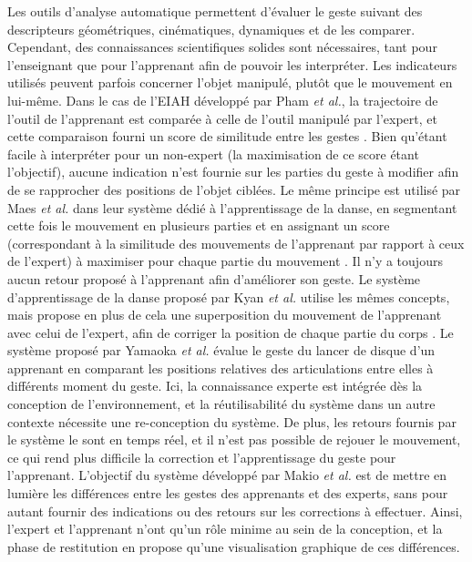 Les outils d'analyse automatique permettent d'évaluer le geste suivant des descripteurs géométriques, cinématiques, dynamiques et de les comparer. Cependant, des connaissances scientifiques solides sont nécessaires, tant pour l'enseignant que pour l'apprenant afin de pouvoir les interpréter. Les indicateurs utilisés peuvent parfois concerner l'objet manipulé, plutôt que le mouvement en lui-même. Dans le cas de l'EIAH développé par Pham \textit{et al.}, la trajectoire de l'outil de l'apprenant est comparée à celle de l'outil manipulé par l'expert, et cette comparaison fourni un score de similitude entre les gestes \parencite{Pham2010Tdg}. Bien qu'étant facile à interpréter pour un non-expert (la maximisation de ce score étant l'objectif), aucune indication n'est fournie sur les parties du geste à modifier afin de se rapprocher des positions de l'objet ciblées. Le même principe est utilisé par Maes \textit{et al.} dans leur système dédié à l'apprentissage de la danse, en segmentant cette fois le mouvement en plusieurs parties et en assignant un score (correspondant à la similitude des mouvements de l'apprenant par rapport à ceux de l'expert) à maximiser pour chaque partie du mouvement \parencite{Maes2012DtM}. Il n'y a toujours aucun retour proposé à l'apprenant afin d'améliorer son geste. Le système d'apprentissage de la danse proposé par Kyan \textit{et al.} utilise les mêmes concepts, mais propose en plus de cela une superposition du mouvement de l'apprenant avec celui de l'expert, afin de corriger la position de chaque partie du corps \parencite{Kyan2015ABD}. Le système proposé par Yamaoka \textit{et al.} évalue le geste du lancer de disque d'un apprenant en comparant les positions relatives des articulations entre elles à différents moment du geste. Ici, la connaissance experte est intégrée dès la conception de l'environnement, et la réutilisabilité du système dans un autre contexte nécessite une re-conception du système. De plus, les retours fournis par le système le sont en temps réel, et il n'est pas possible de rejouer le mouvement, ce qui rend plus difficile la correction et l'apprentissage du geste pour l'apprenant. L'objectif du système développé par Makio \textit{et al.} est de mettre en lumière les différences entre les gestes des apprenants et des experts, sans pour autant fournir des indications ou des retours sur les corrections à effectuer. Ainsi, l'expert et l'apprenant n'ont qu'un rôle minime au sein de la conception, et la phase de restitution en propose qu'une visualisation graphique de ces différences.

